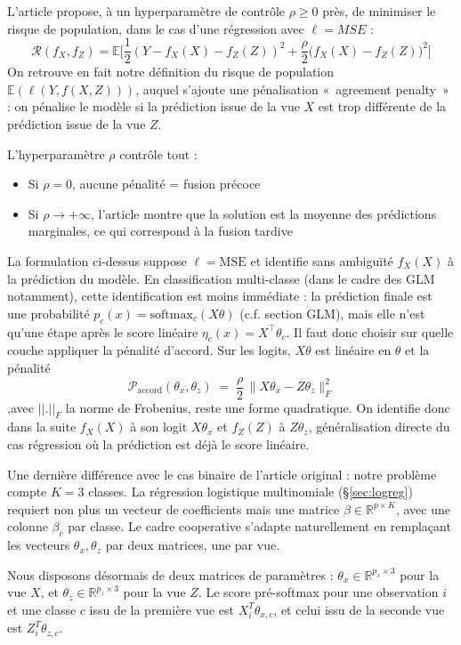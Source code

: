 \documentclass[a4paper,11pt]{paper}
\theoremstyle{plain}
\theoremstyle{definition}
\theoremstyle{remark}
\begin{document}
L'article propose, à un hyperparamètre de contrôle $\rho \geqslant 0$ près, de minimiser le risque de population, dans le cas d'une régression avec $\ell = MSE$ :
$$\mathcal R(f_X, f_Z) = \mathbb E\bigg[ \dfrac{1}{2}(Y - f_X(X) - f_Z(Z))^2 + \dfrac{\rho}{2}(f_X(X) - f_Z(Z)\big)^2\bigg]$$
On retrouve en fait notre définition du risque de population $\mathbb E(\ell(Y, f(X, Z)))$, auquel s'ajoute une pénalisation «~agreement penalty~» :  on pénalise le modèle si la prédiction issue de la vue $X$ est trop différente de la prédiction issue de la vue $Z$.

L'hyperparamètre $\rho$ contrôle tout :
\begin{itemize}
    \item Si $\rho = 0$, aucune pénalité = fusion précoce
    \item Si $\rho \to +\infty$, l'article montre que la solution est la moyenne des prédictions marginales, ce qui correspond à la fusion tardive
\end{itemize}

La formulation ci-dessus suppose $\ell = \mathrm{MSE}$ et identifie sans ambiguïté $f_X(X)$ à la prédiction du modèle. En classification multi-classe (dans le cadre des GLM notamment), cette identification est moins immédiate : la prédiction finale est une probabilité $p_c(x) = \mathrm{softmax}_c(X\theta)$ (c.f. section GLM), mais elle n'est qu'une étape après le score linéaire $\eta_c(x) = X^{\!\top}\theta_c$. Il faut donc choisir sur quelle couche appliquer la pénalité d'accord. Sur les logits, $X\theta$ est linéaire en $\theta$ et la pénalité
\[
    \mathcal{P}_{\mathrm{accord}}(\theta_x,\theta_z) \;=\;
    \frac{\rho}{2}\,\|X\theta_x - Z\theta_z\|_F^{2}
\]
,avec $||.||_F$ la norme de Frobenius, reste une forme quadratique. On identifie donc dans la suite $f_X(X)$
à son logit $X\theta_x$ et $f_Z(Z)$ à $Z\theta_z$, généralisation directe du cas régression où la prédiction est déjà le score linéaire.

Une dernière différence avec le cas binaire de l'article original : notre problème compte $K=3$ classes. La régression logistique multinomiale (§\ref{sec:logreg}) requiert non plus un vecteur de
coefficients mais une matrice $\beta \in \mathbb{R}^{p \times K}$, avec une colonne $\beta_c$ par classe. Le cadre cooperative s'adapte naturellement en remplaçant les vecteurs $\theta_x, \theta_z$ par deux matrices, une par vue.

Nous disposons désormais de deux matrices de paramètres : $\theta_x \in \mathbb{R}^{p_x \times 3}$ pour la vue $X$, et $\theta_z \in \mathbb{R}^{p_z \times 3}$ pour la vue $Z$. Le score pré-softmax pour une observation $i$ et une classe $c$ issu de la première vue est $X_i^T \theta_{x,c}$, et celui issu de la seconde vue est $Z_i^T \theta_{z,c}$.
\end{document}
